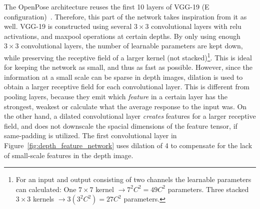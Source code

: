 The OpenPose architecture reuses the first 10 layers of VGG-19 (E configuration)~\cite{simonyan2015deep}. Therefore, this part of the network takes inspiration from it as well. VGG-19 is constructed using several $3 \times 3$ convolutional layers with \gls{relu}~\cite{nairHintonRelu} activations, and maxpool operations at certain depths. By only using enough $3 \times 3$ convolutional layers, the number of learnable parameters are kept down, while preserving the receptive field of a larger kernel (not stacked)\footnote{For an input and output consisting of two channels the learnable parameters can calculated: One $7 \times 7$ kernel $\rightarrow 7^{2}C^{2} = 49C^{2}$ parameters. Three stacked $3 \times 3$ kernels $\rightarrow 3(3^{2}C^{2}) = 27C^{2}$ parameters.}. This is ideal for keeping the network as small, and thus as fast as possible. However, since the information at a small scale can be sparse in depth images, dilation is used to obtain a larger receptive field for each convolutional layer. This is different from pooling layers, because they emit which \emph{feature} in a certain layer has the strongest, weakest or calculate what the average response to the input was. On the other hand, a dilated convolutional layer \emph{creates} features for a larger receptive field, and does not downscale the spacial dimensions of the feature tensor, if same-padding is utilized. The first convolutional layer in Figure~\ref{fig:depth_feature_network} uses dilation of 4 to compensate for the lack of small-scale features in the depth image.


